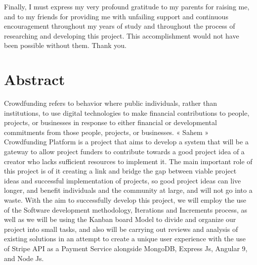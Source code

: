 Finally, I must express my very profound gratitude to my parents for raising me, and to my friends for providing me with unfailing support and continuous encouragement throughout my years of study and throughout the process of researching and developing this project.
This accomplishment would not have been possible without them. Thank you.

\cleardoublepage%
\chapter*{Abstract}

Crowdfunding refers to behavior where public individuals, rather than institutions, to use digital
technologies to make financial contributions to people, projects, or businesses in response to
either financial or developmental commitments from those people, projects, or businesses.
« Sahem » Crowdfunding Platform is a project that aims to develop a system that will be a gateway to allow project funders to
contribute towards a good project idea of a creator who lacks sufficient resources to implement
it. The main important role of this project is of it creating a link and  bridge the gap between
viable project ideas and successful implementation of
projects, so good project ideas can live longer, and benefit individuals and the community 
at large, and will not go into a waste.
With the aim to successfully develop this project, we will employ the use of the Software
development methodology, Iterations and Increments process, as well as we will be using the Kanban board Model
to divide and organize our project into small tasks, and also will be carrying out reviews and analysis of existing solutions in an attempt to
create a unique user experience with the use of Stripe API as a Payment Service alongside MongoDB, Express Js, Angular 9, and Node Js.


\cleardoublepage%
